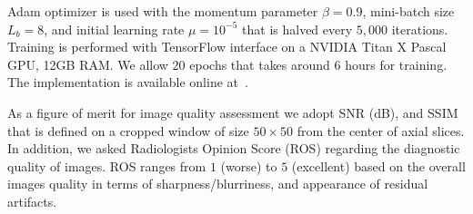 \documentclass{journal}
\begin{document}








Adam optimizer is used with the momentum parameter $\beta=0.9$, mini-batch size $L_b=8$, and initial learning rate $\mu=10^{-5}$ that is halved every $5,000$ iterations. Training is performed with TensorFlow interface on a NVIDIA Titan X Pascal GPU, 12GB RAM. We allow $20$ epochs that takes around $6$ hours for training. The implementation is available online at~\cite{github-gancs-2017}. 


As a figure of merit for image quality assessment we adopt SNR (dB), and SSIM that is defined on a cropped window of size $50 \times 50$ from the center of axial slices. In addition, we asked Radiologists Opinion Score (ROS) regarding the diagnostic quality of images. ROS ranges from $1$ (worse) to $5$ (excellent) based on the overall images quality in terms of sharpness/blurriness, and appearance of residual artifacts. 
\end{document}
